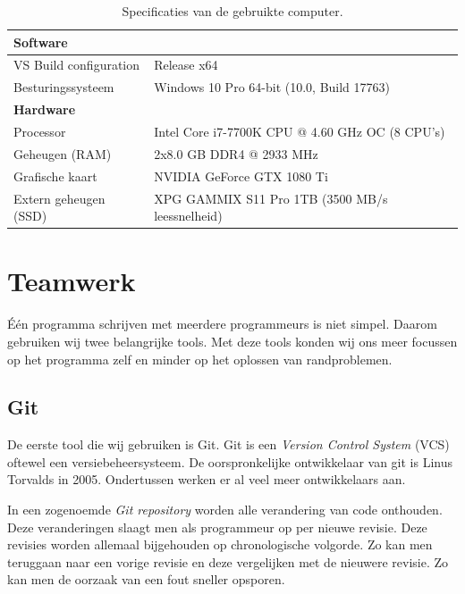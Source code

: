 \begin{table}[ht]
    \centering
    \begin{tabular}{|l|l|}
        \hline
        \multicolumn{2}{|l|}{\bfseries Software} \\
        \hline
        VS Build configuration  & Release x64 \\
        Besturingssysteem       & Windows 10 Pro 64-bit (10.0, Build 17763) \\
        \hline
        \hline
        \multicolumn{2}{|l|}{\bfseries Hardware} \\
        \hline
        Processor               & Intel Core i7-7700K CPU @ 4.60 GHz OC (8 CPU's) \\
        Geheugen (RAM)          & 2x8.0 GB DDR4 @ 2933 MHz \\
        Grafische kaart         & NVIDIA GeForce GTX 1080 Ti \\
        Extern geheugen (SSD)   & XPG GAMMIX S11 Pro 1TB (3500 MB/s leessnelheid)\\
        \hline
    \end{tabular}
    \caption{Specificaties van de gebruikte computer.}
    \label{tab:pc-specs}
\end{table}

\clearpage

\section{Teamwerk}
Één programma schrijven met meerdere programmeurs is niet simpel. Daarom gebruiken wij twee belangrijke tools. Met deze tools konden wij ons meer focussen op het programma zelf en minder op het oplossen van randproblemen.

\subsection{Git}
De eerste tool die wij gebruiken is Git.
Git is een \textit{Version Control System} (VCS) oftewel een versiebeheersysteem. De oorspronkelijke ontwikkelaar van git is Linus Torvalds in 2005.\cite{git:init} Ondertussen werken er al veel meer ontwikkelaars aan.

In een zogenoemde \textit{Git repository} worden alle verandering van code onthouden. Deze veranderingen slaagt men als programmeur op per nieuwe revisie. Deze revisies worden allemaal bijgehouden op chronologische volgorde. Zo kan men teruggaan naar een vorige revisie en deze vergelijken met de nieuwere revisie. Zo kan men de oorzaak van een fout sneller opsporen.

